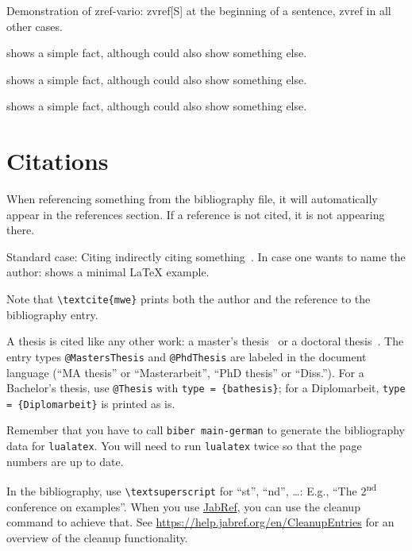 \documentclass[../main-german]{subfiles}
\begin{document}
Demonstration of zref-vario: zvref[S] at the beginning of a sentence, zvref in all other cases.

\begin{ltgexample}
 shows a simple fact, although  could also show something else.

 shows a simple fact, although  could also show something else.

 shows a simple fact, although  could also show something else.
\end{ltgexample}

\section{Citations}

When referencing something from the bibliography file, it will automatically appear in the references section.
If a reference is not cited, it is not appearing there.

\begin{ltgexample}
Standard case: Citing indirectly citing something~\cite{mwe}.
In case one wants to name the author: \textcite{mwe} shows a minimal \LaTeX{} example.
\end{ltgexample}

Note that \texttt{\textbackslash textcite\{mwe\}} prints both the author and the reference to the bibliography entry.

A thesis is cited like any other work: a master's thesis~\cite{Shannon1940} or a doctoral thesis~\cite{Nash1950}.
The entry types \texttt{@MastersThesis} and \texttt{@PhdThesis} are labeled in the document language (\enquote{MA thesis} or \enquote{Masterarbeit}, \enquote{PhD thesis} or \enquote{Diss.}).
For a Bachelor's thesis, use \texttt{@Thesis} with \texttt{type = \{bathesis\}}; for a Diplomarbeit, \texttt{type = \{Diplomarbeit\}} is printed as is.

Remember that you have to call \texttt{biber main-german} to generate the bibliography data for \texttt{lualatex}.
You will need to run \texttt{lualatex} twice so that the page numbers are up to date.


In the bibliography, use \texttt{\textbackslash textsuperscript} for \enquote{st}, \enquote{nd}, \ldots:
E.g., \enquote{The 2\textsuperscript{nd} conference on examples}.
When you use \href{https://www.jabref.org}{JabRef}, you can use the cleanup command to achieve that.
See \url{https://help.jabref.org/en/CleanupEntries} for an overview of the cleanup functionality.
\end{document}
